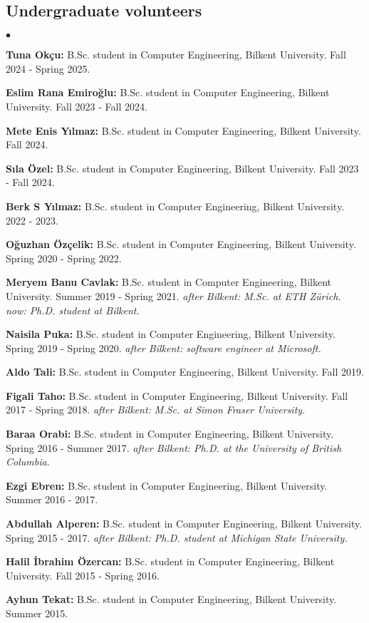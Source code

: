 \documentclass[margin,line]{res}
\newenvironment{list2}{
  \begin{list}{$\bullet$}{%
      \setlength{\itemsep}{0.1cm}
      \setlength{\parsep}{0in} \setlength{\parskip}{0in}
      \setlength{\topsep}{0in} \setlength{\partopsep}{0in} 
      \setlength{\leftmargin}{0.2in}}}{\end{list}}
\begin{document}
\begin{resume}
\subsection{\small \sc Undergraduate volunteers}
\begin{list2}
\item  \textbf{Tuna Okçu:} B.Sc. student in Computer Engineering,  Bilkent University.  Fall 2024 - Spring 2025.
\item {\bf Eslim Rana Emiroğlu:} B.Sc. student in Computer Engineering,  Bilkent University. Fall 2023 - Fall 2024.
\item {\bf Mete Enis Yılmaz:} B.Sc. student in Computer Engineering,  Bilkent University. Fall 2024.
\item {\bf Sıla Özel:} B.Sc. student in Computer Engineering,  Bilkent University. Fall 2023 - Fall 2024.
\item {\bf Berk S Yılmaz:} B.Sc. student in Computer Engineering,  Bilkent University. 2022 - 2023.
\item {\bf Oğuzhan Özçelik:} B.Sc. student in Computer Engineering,  Bilkent University. Spring 2020 - Spring 2022.
\item {\bf Meryem Banu Cavlak:} B.Sc. student in Computer Engineering,  Bilkent University. Summer 2019 - Spring 2021. {\it after Bilkent: M.Sc. at ETH Zürich. now: Ph.D. student at Bilkent.}
\item {\bf Naisila Puka:} B.Sc. student in Computer Engineering,  Bilkent University. Spring 2019 - Spring 2020. {\it after Bilkent: software engineer at Microsoft.}
  \item {\bf Aldo Tali:} B.Sc. student in Computer Engineering,  Bilkent University. Fall 2019.
\item {\bf Figali Taho:} B.Sc. student in Computer Engineering,  Bilkent University. Fall 2017 - Spring 2018. {\it after Bilkent: M.Sc. at Simon Fraser University.}
\item {\bf Baraa Orabi:} B.Sc. student in Computer Engineering,  Bilkent University. Spring 2016 - Summer 2017. {\it after Bilkent: Ph.D. at the University of British Columbia.}
\item {\bf Ezgi Ebren:} B.Sc. student in Computer Engineering,  Bilkent University. Summer 2016 - 2017.
\item {\bf Abdullah Alperen:} B.Sc. student in Computer Engineering,  Bilkent University. Spring 2015 - 2017. {\it after Bilkent: Ph.D. student at Michigan State University.}
\item {\bf Halil İbrahim Özercan:} B.Sc. student in Computer Engineering,  Bilkent University. Fall 2015 - Spring 2016. 
\item {\bf Ayhun Tekat:} B.Sc. student in Computer Engineering,  Bilkent University. Summer 2015. 


\end{list2}
\end{resume}
\end{document}
